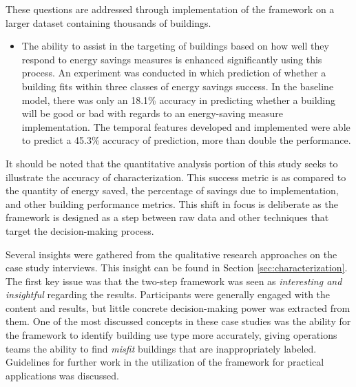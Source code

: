 These questions are addressed through implementation of the framework on a larger dataset containing thousands of buildings.

\begin{itemize}
\item The ability to assist in the targeting of buildings based on how well they respond to energy savings measures is enhanced significantly using this process. An experiment was conducted in which prediction of whether a building fits within three classes of energy savings success. In the baseline model, there was only an 18.1\% accuracy in predicting whether a building will be good or bad with regards to an energy-saving measure implementation. The temporal features developed and implemented were able to predict a 45.3\% accuracy of prediction, more than double the performance.
\end{itemize}

It should be noted that the quantitative analysis portion of this study seeks to illustrate the accuracy of characterization. This success metric is as compared to the quantity of energy saved, the percentage of savings due to implementation, and other building performance metrics. This shift in focus is deliberate as the framework is designed as a step between raw data and other techniques that target the decision-making process. 

Several insights were gathered from the qualitative research approaches on the case study interviews. This insight can be found in Section \ref{sec:characterization}. The first key issue was that the two-step framework was seen as \emph{interesting and insightful} regarding the results. Participants were generally engaged with the content and results, but little concrete decision-making power was extracted from them. One of the most discussed concepts in these case studies was the ability for the framework to identify building use type more accurately, giving operations teams the ability to find \emph{misfit} buildings that are inappropriately labeled. Guidelines for further work in the utilization of the framework for practical applications was discussed.


